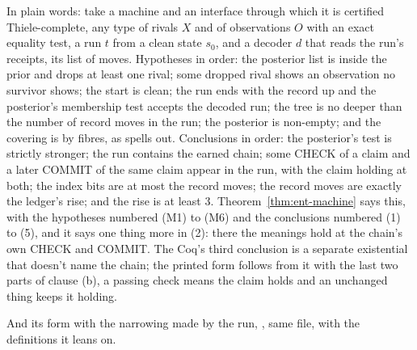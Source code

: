 In plain words: take a machine and an interface through which it is certified Thiele-complete, any type of
rivals $X$ and of observations $O$ with an exact equality test, a run $t$ from a clean
state $s_0$, and a decoder $d$ that reads the run's receipts, its list of moves. Hypotheses
in order: the posterior list is inside the prior and drops at least one rival; some dropped rival
shows an observation no survivor shows; the start is clean; the run ends with the record up and the
posterior's membership test accepts the decoded run; the tree is no deeper than the number of record
moves in the run; the posterior is non-empty; and the covering is by fibres, as
 spells out. Conclusions in order: the posterior's test is strictly stronger; the
run contains the earned chain; some CHECK of a claim and a later COMMIT of the same claim appear in the run, with the claim holding at both; the index
bits are at most the record moves; the record moves are exactly the ledger's rise; and the rise is at
least 3. Theorem~\ref{thm:ent-machine} says this, with the hypotheses numbered (M1) to (M6)
and the conclusions numbered (1) to (5), and it says one thing more in (2): there the meanings hold at the chain's own CHECK and COMMIT. The Coq's third conclusion is a separate existential that doesn't name
the chain; the printed form follows from it with the last two parts of clause (b), a passing check means the claim holds and an unchanged thing keeps it holding.

{\raggedright And its form with the narrowing made by the run, , same file, with the definitions it leans on.\par}

